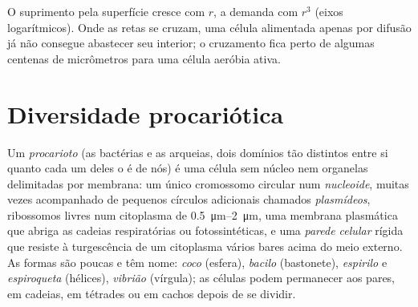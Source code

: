 \begin{omfigure}

{\small O suprimento pela superfície cresce com $r$, a demanda com
$r^3$ (eixos logarítmicos). Onde as retas se cruzam, uma célula
alimentada apenas por difusão já não consegue abastecer seu interior;
o cruzamento fica perto de algumas centenas de micrômetros para uma
célula aeróbia ativa.}
\end{omfigure}

\section{Diversidade procariótica}

\begin{definition}\label{def:b2:unicellular-diversity:prokaryote}
Um \emph{procarioto} (as bactérias e as arqueias,
dois domínios tão distintos entre si quanto cada um deles o é de nós) é
uma célula sem núcleo nem organelas delimitadas por membrana: um único
cromossomo circular num \emph{nucleoide}, muitas vezes
acompanhado de pequenos círculos adicionais chamados
\emph{plasmídeos}, ribossomos livres num citoplasma
de \qtyrange{0.5}{2}{\micro m}, uma membrana plasmática que abriga as
cadeias respiratórias ou fotossintéticas, e uma
\emph{parede celular} rígida que
resiste à turgescência de um citoplasma vários bares acima do meio
externo. As formas são poucas e têm nome: \emph{coco} (esfera),
\emph{bacilo} (bastonete), \emph{espirilo} e \emph{espiroqueta}
(hélices), \emph{vibrião} (vírgula); as células podem permanecer aos
pares, em cadeias, em tétrades ou em cachos depois de se dividir.
\end{definition}

